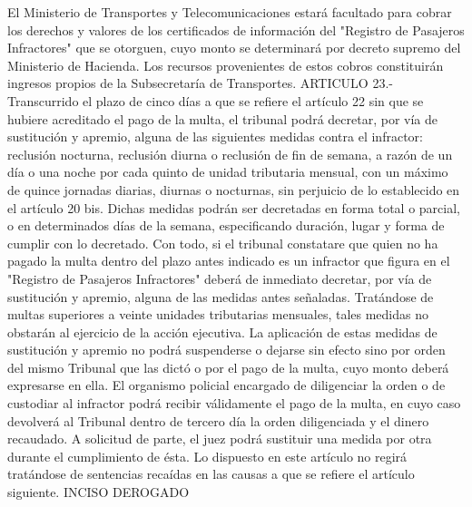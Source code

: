     El Ministerio de Transportes y Telecomunicaciones estará facultado para cobrar los derechos y valores de los certificados de información del "Registro de Pasajeros Infractores" que se otorguen, cuyo monto se determinará por decreto supremo del Ministerio de Hacienda. Los recursos provenientes de estos cobros constituirán ingresos propios de la Subsecretaría de Transportes.
    ARTICULO 23.- Transcurrido el plazo de cinco días a que se refiere el artículo 22 sin que se hubiere acreditado el pago de la multa, el tribunal podrá decretar, por vía de sustitución y apremio, alguna de las siguientes medidas contra el infractor: reclusión nocturna, reclusión diurna o reclusión de fin de semana, a razón de un día o una noche por cada quinto de unidad tributaria mensual, con un máximo de quince jornadas diarias, diurnas o nocturnas, sin perjuicio de lo establecido en el artículo 20 bis. Dichas medidas podrán ser decretadas en forma total o parcial, o en determinados días de la semana, especificando duración, lugar y forma de cumplir con lo decretado. Con todo, si el tribunal constatare que quien no ha pagado la multa dentro del plazo antes indicado es un infractor que figura en el "Registro de Pasajeros Infractores" deberá de inmediato decretar, por vía de sustitución y apremio, alguna de las medidas antes señaladas.
    Tratándose de multas superiores a veinte unidades tributarias mensuales, tales medidas no obstarán al ejercicio de la acción ejecutiva.
    La aplicación de estas medidas de sustitución y apremio no podrá suspenderse o dejarse sin efecto sino por orden del mismo Tribunal que las dictó o por el pago de la multa, cuyo monto deberá expresarse en ella. El organismo policial encargado de diligenciar la orden o de custodiar al infractor podrá recibir válidamente el pago de la multa, en cuyo caso devolverá al Tribunal dentro de tercero día la orden diligenciada y el dinero recaudado.
    A solicitud de parte, el juez podrá sustituir una medida por otra durante el cumplimiento de ésta.
    Lo dispuesto en este artículo no regirá tratándose de sentencias recaídas en las causas a que se refiere el artículo siguiente.
    INCISO DEROGADO



